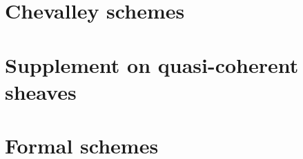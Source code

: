 \documentclass[10pt,oneside]{amsart}
\begin{document}
    \section{Chevalley schemes}

        

        

        

    \section{Supplement on quasi-coherent sheaves}

        

        
        
        
        
        
        
        
        
        
        

    \section{Formal schemes}
\end{document}
